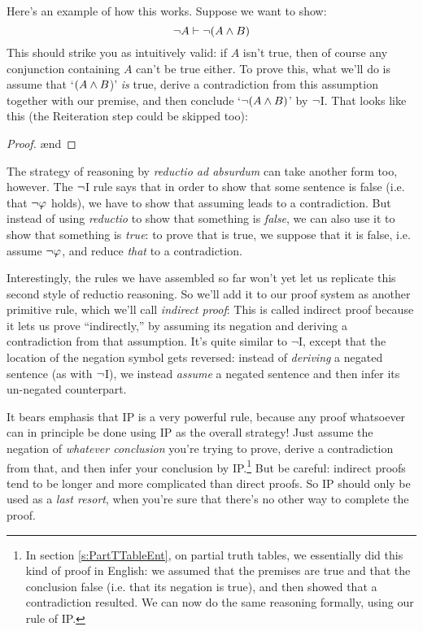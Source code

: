 Here's an example of how this works.  Suppose we want to show:
$$\neg A \vdash \neg(A \wedge B)$$
This should strike you as intuitively valid: if $A$ isn't true, then of course any conjunction containing $A$ can't be true either.  To prove this, what we'll do is assume that `$(A \wedge B$)' \emph{is} true, derive a contradiction from this assumption together with our premise, and then conclude `$\neg (A \wedge B)$' by $\neg$I.  That looks like this (the Reiteration step could be skipped too):
\begin{proof}
	 
	\open
	 
	\ae{nd}
	\close
\end{proof}

The strategy of reasoning by \emph{reductio ad absurdum} can take another form too, however. The $\neg$I rule says that in order to show that some sentence \meta{\varphi} is false (i.e. that $\neg \mathcal{\varphi}$ holds), we have to show that assuming \meta{\varphi} leads to a contradiction.  But instead of using \emph{reductio} to show that something is \emph{false}, we can also use it to show that something is \emph{true}: to prove that \meta{\varphi} is true, we suppose that it is false, i.e. assume $\neg \mathcal{\varphi}$, and reduce \emph{that} to a contradiction.



Interestingly, the rules we have assembled so far won't yet let us replicate this second style of reductio reasoning.  So we'll add it to our proof system as another primitive rule, which we'll call \emph{indirect proof}:
This is called indirect proof because it lets us prove \meta{\varphi} ``indirectly,'' by assuming its negation and deriving a contradiction from that assumption. It's quite similar to $\lnot$I, except that the location of the negation symbol gets reversed: instead of \emph{deriving} a negated sentence (as with $\neg$I), we instead \emph{assume} a negated sentence and then infer its un-negated counterpart.

It bears emphasis that IP is a very powerful rule, because any proof whatsoever can in principle be done using IP as the overall strategy!  Just assume the negation of \emph{whatever conclusion} you're trying to prove, derive a contradiction from that, and then infer your conclusion by IP.\footnote{In section \ref{s:PartTTableEnt}, on partial truth tables, we essentially did this kind of proof in English: we assumed that the premises are true and  that the conclusion false (i.e. that its negation  is true), and then showed that a contradiction resulted.  We can now do the same reasoning formally, using our rule of IP.}  But be careful: indirect proofs tend to be longer and more complicated than direct proofs.  So IP should only be used as a \emph{last resort}, when you're sure that there's no other way to complete the proof.

